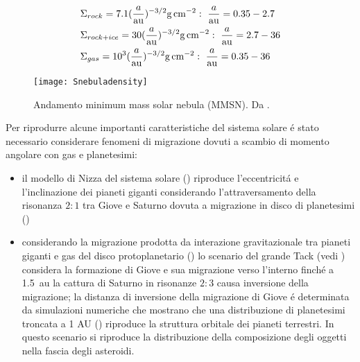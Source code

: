 \begin{align}
&\Sigma_{rock}=7.1(\frac{a}{\si{\astronomicalunit}})\expy{-3/2}\si{\gram\per\square\cm}:\ \frac{a}{\si{\astronomicalunit}}=0.35-2.7\\
&\Sigma_{rock+ice}=30(\frac{a}{\si{\astronomicalunit}})\expy{-3/2}\si{\gram\per\square\cm}:\ \frac{a}{\si{\astronomicalunit}}=2.7-36\\
&\Sigma_{gas}=\num{e3}(\frac{a}{\si{\astronomicalunit}})\expy{-3/2}\si{\gram\per\square\cm}:\ \frac{a}{\si{\astronomicalunit}}=0.35-36
\end{align}

\begin{wrapfigure}[22]{r}{0.45\textwidth}
	\texttt{[image: Snebuladensity]}\caption{Andamento minimum mass solar nebula (MMSN). Da \cite{weidenschilling1977distribution}.}\label{fig:Snebuladensity}
\end{wrapfigure}

Per riprodurre alcune importanti caratteristiche del sistema solare \'e stato necessario considerare fenomeni di migrazione dovuti a scambio di momento angolare con gas e planetesimi:
\begin{itemize}
	\item  il modello di Nizza del sistema solare (\cite{tsiganis2005origin}) riproduce l'eccentricit\'a e l'inclinazione dei pianeti giganti considerando l'attraversamento della risonanza $2:1$ tra Giove e Saturno dovuta a migrazione in disco di planetesimi (\cite{hahn1999orbital})
	\item considerando la migrazione prodotta da interazione gravitazionale tra pianeti giganti e gas del disco protoplanetario (\cite{lin1986tidal}) lo scenario del grande Tack (vedi \cite{walsh2011low}) considera la formazione di Giove e sua migrazione verso l'interno finch\'e a \SI{1.5}{\astronomicalunit} la cattura di Saturno in risonanze $2:3$ causa inversione della migrazione; la distanza di inversione della migrazione di Giove \'e determinata da simulazioni numeriche che mostrano che una distribuzione di planetesimi troncata a 1 AU (\cite{hansen2009formation}) riproduce la struttura orbitale dei pianeti terrestri. In questo scenario si riproduce la distribuzione della composizione degli oggetti nella fascia degli asteroidi.
\end{itemize}


